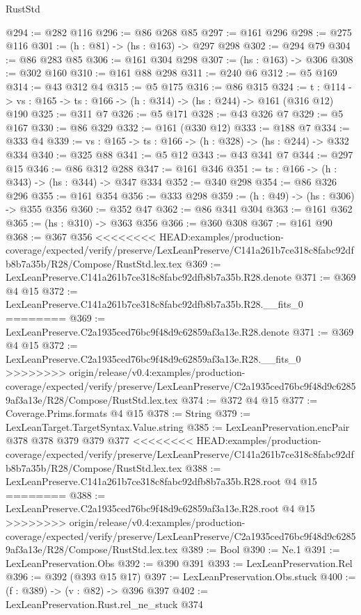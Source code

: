 \begin{lexlean}{RustStd}
\begin{coremodule}
{\begin{coremodule}
@294 := @282 @116
@296 := @86 @268 @85
@297 := @161 @296
@298 := @275 @116
@301 := (h : @81) -> (hs : @163) -> @297 @298
@302 := @294 @79
@304 := @86 @283 @85
@306 := @161 @304 @298
@307 := (hs : @163) -> @306
@308 := @302 @160
@310 := @161 @88 @298
@311 := @240 @6
@312 := @5 @169
@314 := @43 @312 @4
@315 := @5 @175
@316 := @86 @315
@324 := {t : @114} ->
  {vs : @165} -> {ts : @166} -> (h : @314) -> (hs : @244) -> @161 (@316 @12) @190
@325 := @311 @7
@326 := @5 @171
@328 := @43 @326 @7
@329 := @5 @167
@330 := @86 @329
@332 := @161 (@330 @12)
@333 := @188 @7
@334 := @333 @4
@339 := {vs : @165} -> {ts : @166} -> (h : @328) -> (hs : @244) -> @332 @334
@340 := @325 @88
@341 := @5 @12
@343 := @43 @341 @7
@344 := @297 @15
@346 := @86 @312 @288
@347 := @161 @346
@351 := {ts : @166} -> (h : @343) -> (hs : @344) -> @347 @334
@352 := @340 @298
@354 := @86 @326 @296
@355 := @161 @354
@356 := @333 @298
@359 := (h : @49) -> (hs : @306) -> @355 @356
@360 := @352 @47
@362 := @86 @341 @304
@363 := @161 @362
@365 := (hs : @310) -> @363 @356
@366 := @360 @308
@367 := @161 @90
@368 := @367 @356
<<<<<<<< HEAD:examples/production-coverage/expected/verify/preserve/LexLeanPreserve/C141a261b7ce318c8fabc92dfb8b7a35b/R28/Compose/RustStd.lex.tex
@369 := LexLeanPreserve.C141a261b7ce318c8fabc92dfb8b7a35b.R28.denote
@371 := @369 @4 @15
@372 := LexLeanPreserve.C141a261b7ce318c8fabc92dfb8b7a35b.R28.__fits_0
========
@369 := LexLeanPreserve.C2a1935ced76bc9f48d9c62859af3a13e.R28.denote
@371 := @369 @4 @15
@372 := LexLeanPreserve.C2a1935ced76bc9f48d9c62859af3a13e.R28.__fits_0
>>>>>>>> origin/release/v0.4:examples/production-coverage/expected/verify/preserve/LexLeanPreserve/C2a1935ced76bc9f48d9c62859af3a13e/R28/Compose/RustStd.lex.tex
@374 := @372 @4 @15
@377 := Coverage.Prims.formats @4 @15
@378 := String
@379 := LexLeanTarget.TargetSyntax.Value.string
@385 := LexLeanPreservation.encPair @378 @378 @379 @379 @377
<<<<<<<< HEAD:examples/production-coverage/expected/verify/preserve/LexLeanPreserve/C141a261b7ce318c8fabc92dfb8b7a35b/R28/Compose/RustStd.lex.tex
@388 := LexLeanPreserve.C141a261b7ce318c8fabc92dfb8b7a35b.R28.root @4 @15
========
@388 := LexLeanPreserve.C2a1935ced76bc9f48d9c62859af3a13e.R28.root @4 @15
>>>>>>>> origin/release/v0.4:examples/production-coverage/expected/verify/preserve/LexLeanPreserve/C2a1935ced76bc9f48d9c62859af3a13e/R28/Compose/RustStd.lex.tex
@389 := Bool
@390 := Ne.{1}
@391 := LexLeanPreservation.Obs
@392 := @390 @391
@393 := LexLeanPreservation.Rel
@396 := @392 (@393 @15 @17)
@397 := LexLeanPreservation.Obs.stuck
@400 := (f : @389) -> (v : @82) -> @396 @397
@402 := LexLeanPreservation.Rust.rel_ne_stuck @374

\end{coremodule}}
\end{coremodule}
\end{lexlean}
